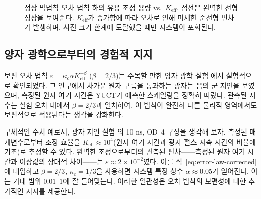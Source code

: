 \documentclass[12pt,a4paper]{article}
\newcommand{\Keff}{K_{\mathrm{eff}}}
\begin{document}
	\begin{figure}[htbp]
		\centering
		\caption{정상 멱법칙 오차 법칙 하의 유용 조정 용량 vs.\ \(K_{\mathrm{eff}}\). 점선은 완벽한 선형 성장을 보여준다. $K_{\mathrm{eff}}$가 증가함에 따라 오차로 인해 미세한 준선형 편차가 발생하며, 사전 크기 한계에 도달했을 때만 시스템이 포화된다.}
		\label{fig:keff-phase}
	\end{figure}
	
	\subsection{양자 광학으로부터의 경험적 지지}
	보편 오차 법칙 $\varepsilon = \kappa_c \alpha K_{\mathrm{eff}}^{-\beta}$ ($\beta=2/3$)는 주목할 만한 양자 광학 실험 \cite{AppendixS}에서 실험적으로 확인되었다. 그 연구에서 차가운 원자 구름을 통과하는 광자는 음의 군 지연을 보였으며, 측정된 원자 여기 시간은 YUCT가 예측한 스케일링을 정확히 따랐다. 관측된 지수는 실험 오차 내에서 $\beta=2/3$과 일치하여, 이 법칙이 완전히 다른 물리적 영역에서도 보편적으로 적용된다는 생각을 강화한다.
	
	구체적인 수치 예로서, 광자 지연 실험 \cite{AppendixS}의 10 ns, OD~4 구성을 생각해 보자. 측정된 매개변수로부터 조정 효율을 $\Keff \approx 10^4$(원자 여기 시간과 광자 펄스 지속 시간의 비율에 기초)로 추정할 수 있다. 완벽한 조정으로부터의 관측된 편차——측정된 원자 여기 시간과 이상값의 상대적 차이——는 $\varepsilon \approx 2\times 10^{-2}$였다. 이를 식~\eqref{eq:error-law-corrected}에 대입하고 $\beta=2/3$, $\kappa_c=1/3$을 사용하면 시스템 특정 상수 $\alpha \approx 0.05$가 얻어진다. 이는 기대 범위 $0.01$–$1$에 잘 들어맞는다. 이러한 일관성은 오차 법칙의 보편성에 대한 추가적인 지지를 제공한다.
	
\end{document}
